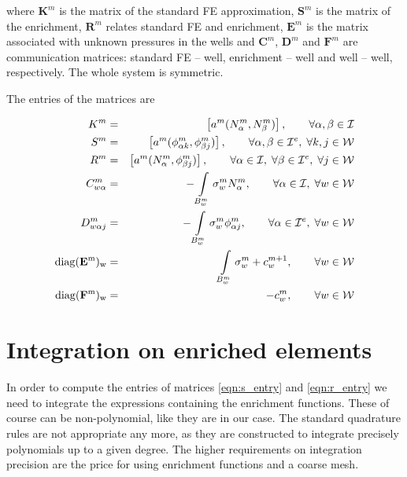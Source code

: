 \documentclass[preprint,12pt,authoryear]{elsarticle}
\begin{document}
where $\mathbf{K}^m$ is the matrix of the standard FE approximation, $\mathbf{S}^m$ is the matrix of the 
enrichment, $\mathbf{R}^m$ relates standard FE and enrichment,  $\mathbf{E}^m$ is the matrix associated with 
unknown pressures in the wells and 
$\mathbf{C}^m$, $\mathbf{D}^m$ and $\mathbf{F}^m$ are communication matrices: standard FE -- well, 
enrichment -- well and well -- well, respectively. The whole system is symmetric.

The entries of the matrices are 

\begin{eqnarray}
  K^m &=& \left[a^m(N^m_\alpha, N^m_\beta)\right]   ,\qquad \forall \alpha,\beta\in \mathcal{I} \label{eqn:k_entry}\\
  S^m &=& \left[a^m(\phi^m_{\alpha k}, \phi^m_{\beta j})\right]     ,\qquad \forall \alpha,\beta\in \mathcal{I}^e,\; \forall k,j\in\mathcal{W} \label{eqn:s_entry}\\
  R^m &=& \left[a^m(N^m_{\alpha}, \phi^m_{\beta j})\right]      ,\qquad \forall \alpha\in \mathcal{I},\; \forall\beta\in\mathcal{I}^e,\; \forall j\in\mathcal{W} \label{eqn:r_entry}\\
  C^m_{w\alpha} &=&-\int\limits_{B^m_w} \sigma^m_w N^m_\alpha   ,\qquad \forall \alpha\in \mathcal{I},\; \forall w\in\mathcal{W}\\
  D^m_{w\alpha j} &=&-\int\limits_{B^m_w} \sigma^m_w \phi^m_{\alpha j}  ,\qquad \forall \alpha\in \mathcal{I}^e,\; \forall w\in\mathcal{W}\\
  \rm{diag}(\mathbf{E}^m)_w &=&\int\limits_{B^m_w} \sigma^m_w + c^{m+1}_w   ,\qquad \forall w\in\mathcal{W}\\
  \rm{diag}(\mathbf{F}^m)_w &=& -c^m_w ,\qquad \forall w\in\mathcal{W}
\end{eqnarray}

\section{Integration on enriched elements}
\label{sec:integration}
In order to compute the entries of matrices \eqref{eqn:s_entry} and \eqref{eqn:r_entry} we need to integrate
the expressions containing the enrichment functions. These of course can be non-polynomial, like they are 
in our case. The standard quadrature rules are not appropriate any more, as they are constructed to integrate 
precisely polynomials up to a given degree. The higher requirements on integration precision
are the price for using enrichment functions and a coarse mesh.
\end{document}
